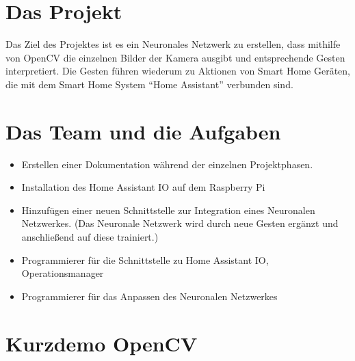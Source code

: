 \documentclass[aspectratio=169]{beamer}
\institute{HS KL Campus Zweibrücken}
\begin{document}
\begin{frame}
\titlepage
\end{frame}

\begin{frame}
\tableofcontents[subsectionstyle=hide]
\end{frame}

\section{Das Projekt}

\begin{frame}
Das Ziel des Projektes ist es ein Neuronales Netzwerk zu erstellen, dass mithilfe
von OpenCV die einzelnen Bilder der Kamera ausgibt und entsprechende
Gesten interpretiert. Die Gesten führen wiederum zu Aktionen von Smart Home
Geräten, die mit dem Smart Home System \enquote{Home Assistant} verbunden sind. 
\end{frame}

\section{Das Team und die Aufgaben}

\begin{frame}
  \begin{itemize}
    \item Erstellen einer Dokumentation während der einzelnen Projektphasen.
    \item Installation des Home Assistant IO auf dem Raspberry Pi
    \item Hinzufügen einer neuen Schnittstelle zur Integration eines Neuronalen
	  Netzwerkes. (Das Neuronale Netzwerk wird durch neue Gesten ergänzt und
	  anschließend auf diese trainiert.)
  \end{itemize}
  \begin{itemize}
    \item Programmierer für die Schnittstelle zu Home Assistant IO, Operationsmanager
    \item Programmierer für das Anpassen des Neuronalen Netzwerkes 
  \end{itemize}
\end{frame}

\section{Kurzdemo OpenCV}
\begin{frame}
  \vskip 0.2cm
  \vfilll
\end{frame}
\end{document}
